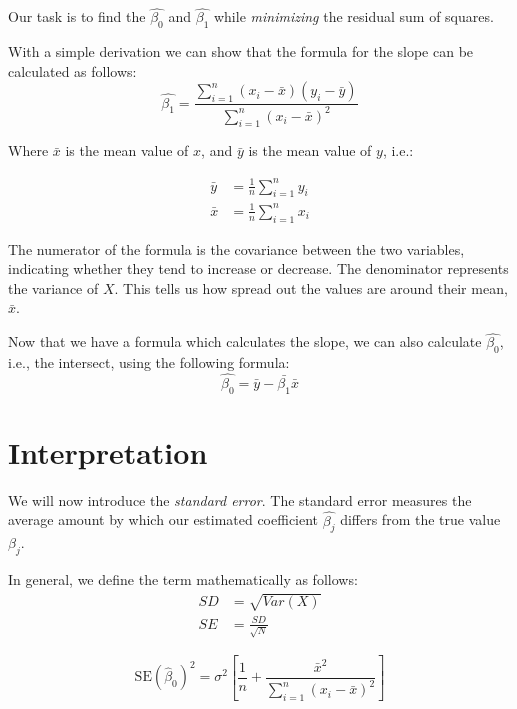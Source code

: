 Our task is to find the $\hat{\beta_{0}}$ and $\hat{\beta_{1}}$ while \textit{minimizing} the residual sum of squares.

With a simple derivation we can show that the formula for the slope can be calculated as follows:
\begin{equation}
	\hat{\beta_{1}} = \frac{\sum_{i=1}^n (x_{i} - \bar{x})(y_{i}- \bar{y})}{\sum_{i=1}^n (x_{i}- \bar{x})^{2}}
\end{equation}

Where $\bar{x}$ is the mean value of $x$, and $\bar{y}$ is the mean value of $y$, i.e.:

\begin{align}
	\bar{y} & = \frac{1}{n}\sum_{i=1}^n y_{i} \\
	\bar{x} & = \frac{1}{n}\sum_{i=1}^n x_{i}
\end{align}

The numerator of the formula is the covariance between the two variables, indicating whether they tend to increase or decrease. The denominator represents the variance of $X$. This tells us how spread out the values are around their mean, $\bar{x}$.

Now that we have a formula which calculates the slope, we can also calculate $\hat{\beta_{0}}$, i.e., the intersect, using the following formula:
\begin{equation}
	\hat{\beta_{0}} = \bar{y} - \bar{\beta_{1}} \bar{x}
\end{equation}

\section{Interpretation}%
\label{sec:label}



We will now introduce the \textit{standard error}. The standard error measures the average amount by which our estimated coefficient $\hat{\beta_{j}}$ differs from the true value ${\beta_{j}}$.

In general, we define the term mathematically as follows:
\begin{align}
	SD & = \sqrt{Var(X)}       \\
	SE & = \frac{SD}{\sqrt{N}}
\end{align}

\begin{equation}
	\text{SE}(\hat{\beta}_0)^2 = \sigma^2 \left[ \frac{1}{n} + \frac{\bar{x}^2}{\sum_{i=1}^{n} (x_i - \bar{x})^2} \right]
\end{equation}

